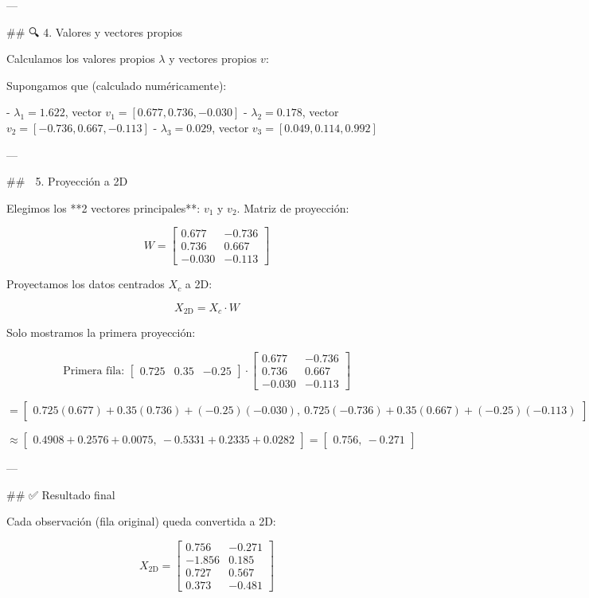 \documentclass[12pt]{article} %
\begin{document}
---

## 🔍 4. Valores y vectores propios

Calculamos los valores propios \( \lambda \) y vectores propios \( v \):

Supongamos que (calculado numéricamente):

- \( \lambda_1 = 1.622 \), vector \( v_1 = [0.677, 0.736, -0.030] \)
- \( \lambda_2 = 0.178 \), vector \( v_2 = [-0.736, 0.667, -0.113] \)
- \( \lambda_3 = 0.029 \), vector \( v_3 = [0.049, 0.114, 0.992] \)

---

## 🔁 5. Proyección a 2D

Elegimos los **2 vectores principales**: \( v_1 \) y \( v_2 \). Matriz de proyección:

\[
W =
\begin{bmatrix}
0.677 & -0.736 \\
0.736 & 0.667 \\
-0.030 & -0.113
\end{bmatrix}
\]

Proyectamos los datos centrados \( X_c \) a 2D:

\[
X_{\text{2D}} = X_c \cdot W
\]

Solo mostramos la primera proyección:

\[
\text{Primera fila: } \begin{bmatrix} 0.725 & 0.35 & -0.25 \end{bmatrix}
\cdot
\begin{bmatrix}
0.677 & -0.736 \\
0.736 & 0.667 \\
-0.030 & -0.113
\end{bmatrix}
\]

\[
= \begin{bmatrix}
0.725(0.677) + 0.35(0.736) + (-0.25)(-0.030),\ 
0.725(-0.736) + 0.35(0.667) + (-0.25)(-0.113)
\end{bmatrix}
\]

\[
\approx \begin{bmatrix} 0.4908 + 0.2576 + 0.0075,\ -0.5331 + 0.2335 + 0.0282 \end{bmatrix}
= \begin{bmatrix} 0.756,\ -0.271 \end{bmatrix}
\]

---

## ✅ Resultado final

Cada observación (fila original) queda convertida a 2D:

\[
X_{\text{2D}} =
\begin{bmatrix}
0.756 & -0.271 \\
-1.856 & 0.185 \\
0.727 & 0.567 \\
0.373 & -0.481
\end{bmatrix}
\]
\end{document}

